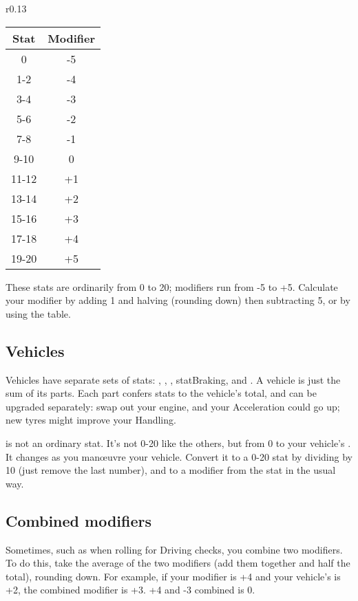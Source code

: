 \documentclass[10pt, a4paper, twocolumn]{article}
\begin{document}
\begin{wraptable}[12]{r}{0.13\textwidth}
\vspace*{-3ex}
\hspace*{-3ex}
\begin{tabular}{cc}
  Stat  & Modifier \\
  \hline 
  0     & -5       \\
  1-2   & -4       \\
  3-4   & -3       \\
  5-6   & -2       \\
  7-8   & -1       \\
  9-10  &  0       \\
  11-12 & +1       \\
  13-14 & +2       \\
  15-16 & +3       \\
  17-18 & +4       \\
  19-20 & +5
\end{tabular}
\end{wraptable}

These stats are ordinarily from 0 to 20; modifiers run from -5 to +5. Calculate
your modifier by adding 1 and halving (rounding down) then subtracting 5, or by
using the table.

\subsection{Vehicles}
Vehicles have separate sets of stats: , ,
, stat{Braking},  and . A vehicle
is just the sum of its parts. Each part confers stats to the vehicle's total,
and can be upgraded separately: swap out your engine, and your Acceleration
could go up; new tyres might improve your Handling. 

 is not an ordinary stat. It's not 0-20 like the others, but from 0
to your vehicle's . It changes as you man\oe{}uvre your
vehicle. Convert it to a 0-20 stat by dividing by 10 (just remove the last
number), and to a modifier from the stat in the usual way.

\subsection{Combined modifiers}
Sometimes, such as when rolling for Driving checks, you combine two
modifiers. To do this, take the average of the two modifiers (add them
together and half the total), rounding down. For example, if your 
modifier is +4 and your vehicle's  is +2, the combined modifier
is +3. +4 and -3 combined is 0.
\end{document}
